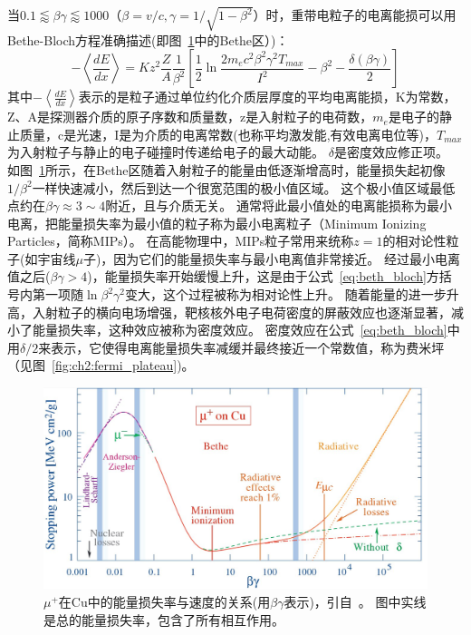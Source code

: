 当$0.1\lessapprox\beta\gamma\lessapprox1000$（$\beta=v/c,\gamma=1/\sqrt{1-{\beta}^2}$）时，重带电粒子的电离能损可以用Bethe-Bloch方程准确描述(即图~\ref{fig:ch2:energyloss_vs_velocity}中的Bethe区）)：
\begin{equation}\label{eq:beth_bloch}
-\left\langle\frac{dE}{dx}\right\rangle = Kz^2\frac{Z}{A}\frac{1}{{\beta}^2}
\left[\frac{1}{2}\ln\frac{2m_ec^2{\beta}^2{\gamma}^2T_{max}}{I^2}-{\beta}^2-\frac{\delta(\beta\gamma)}{2}\right]
\end{equation}
其中$-\left\langle\frac{dE}{dx}\right\rangle$表示的是粒子通过单位约化介质层厚度的平均电离能损，K为常数，Z、A是探测器介质的原子序数和质量数，z是入射粒子的电荷数，$m_e$是电子的静止质量，c是光速，I是为介质的电离常数(也称平均激发能,有效电离电位等)，$T_{max}$为入射粒子与静止的电子碰撞时传递给电子的最大动能。
$\delta$是密度效应修正项。
如图~\ref{fig:ch2:energyloss_vs_velocity}所示，在Bethe区随着入射粒子的能量由低逐渐增高时，能量损失起初像$1/{\beta}^2$一样快速减小，然后到达一个很宽范围的极小值区域。
这个极小值区域最低点约在$\beta\gamma\approx3\sim4$附近，且与介质无关。
通常将此最小值处的电离能损称为最小电离，把能量损失率为最小值的粒子称为最小电离粒子（Minimum Ionizing Particles，简称MIPs）。
在高能物理中，MIPs粒子常用来统称$z=1$的相对论性粒子(如宇宙线$\mu$子)，因为它们的能量损失率与最小电离值非常接近。
经过最小电离值之后($\beta\gamma>4$)，能量损失率开始缓慢上升，这是由于公式~\ref{eq:beth_bloch}方括号内第一项随$\ln{\beta}^2{\gamma}^2$变大，这个过程被称为相对论性上升。
随着能量的进一步升高，入射粒子的横向电场增强，靶核核外电子电荷密度的屏蔽效应也逐渐显著，减小了能量损失率，这种效应被称为密度效应。
密度效应在公式~\ref{eq:beth_bloch}中用$\delta/2$来表示，它使得电离能量损失率减缓并最终接近一个常数值，称为费米坪（见图~\ref{fig:ch2:fermi_plateau})。

\begin{figure}
	\centering
	\includegraphics[width=0.8\linewidth]{chap/description/fig/energyloss_vs_velocity}
	\caption{${\mu}^+$在Cu中的能量损失率与速度的关系(用$\beta\gamma$表示)，引自~\parencite{pdg_book}。 图中实线是总的能量损失率，包含了所有相互作用。}
	\label{fig:ch2:energyloss_vs_velocity}
\end{figure}

